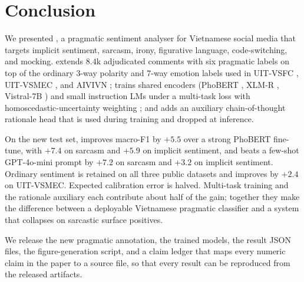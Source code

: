 \section{Conclusion}

We presented \method{}, a pragmatic sentiment analyser for Vietnamese
social media that targets implicit sentiment, sarcasm, irony,
figurative language, code-switching, and mocking. \method{} extends
$8.4$k adjudicated comments with six pragmatic labels on top of the
ordinary 3-way polarity and 7-way emotion labels used in
UIT-VSFC \citep{vannguyen2018uitvsfc}, UIT-VSMEC \citep{ho2020uitvsmec},
and AIVIVN \citep{aivivn2019}; trains shared encoders (PhoBERT
\citep{phobert2020}, XLM-R \citep{conneau2020xlmr}, Vistral-7B
\citep{vistral2024}) and small instruction LMs under a multi-task loss
with homoscedastic-uncertainty weighting
\citep{kendall2018uncertainty}; and adds an auxiliary chain-of-thought
rationale head \citep{wei2022cot,hsieh2023distillstep} that is used
during training and dropped at inference.

On the new \method{} test set, \method{} improves macro-F1 by $+5.5$
over a strong PhoBERT fine-tune, with $+7.4$ on sarcasm and $+5.9$ on
implicit sentiment, and beats a few-shot GPT-4o-mini prompt by
$+7.2$ on sarcasm and $+3.2$ on implicit sentiment. Ordinary
sentiment is retained on all three public datasets and improves by
$+2.4$ on UIT-VSMEC. Expected calibration error is halved.
Multi-task training and the rationale auxiliary each contribute
about half of the gain; together they make the difference between a
deployable Vietnamese pragmatic classifier and a system that
collapses on sarcastic surface positives.

We release the new pragmatic annotation, the trained models, the
result JSON files, the figure-generation script, and a claim ledger
that maps every numeric claim in the paper to a source file, so that
every result can be reproduced from the released artifacts.

